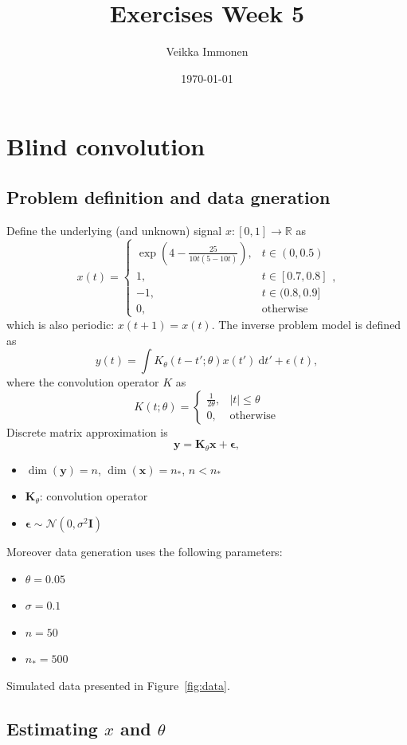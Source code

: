 \documentclass[times, a4paper, 12pt, onecolumn, oneside]{article}
\date{}
\title{ Exercises Week 5}
\author{Veikka Immonen}
\date{\today}
\newcommand{\bm}{\boldsymbol}
\begin{document}
\maketitle

\section{Blind convolution}

\subsection{Problem definition and data gneration}

Define the underlying (and unknown) signal $x: [0, 1] \rightarrow \mathbb{R}$ as
$$
x(t) = \begin{cases}
\exp\left(4 - \frac{25}{10t(5 - 10t)}\right), & t\in(0,0.5) \\
1, & t\in[0.7, 0.8] \\
-1, & t\in(0.8, 0.9] \\
0, & \text{otherwise}
\end{cases},
$$
which is also periodic: $x(t + 1) = x(t)$. The inverse problem model is defined as
$$
y(t) = \int K_\theta(t - t'; \theta)x(t') ~\text{d}t'+ \epsilon(t),
$$
where the convolution operator $K$ as
$$
K(t; \theta) = \begin{cases}\frac{1}{2\theta}, & |t| \le \theta \\ 0, & \text{otherwise}\end{cases}
$$
Discrete matrix approximation is
$$
\bm{y} = \bm{K}_\theta \bm{x} + \bm{\epsilon},
$$
\begin{itemize}
\item $\dim(\bm{y}) = n$, $\dim(\bm{x}) = n_*$, $n < n_*$
\item $\bm{K}_\theta$: convolution operator
\item $\bm{\epsilon} \sim \mathcal{N}(0, \sigma^2\bm{I})$
\end{itemize}
Moreover data generation uses the following parameters:
\begin{itemize}
\item $\theta = 0.05$
\item $\sigma = 0.1$
\item $n = 50$
\item $n_* = 500$
\end{itemize}
Simulated data presented in Figure~\ref{fig:data}.

\subsection{Estimating $x$ and $\theta$}
\end{document}
